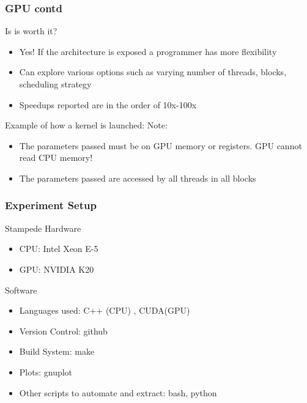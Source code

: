 \documentclass[mathserif]{beamer}
\begin{document}
\begin{frame}                                                                                                                                                                          
\frametitle{GPU contd}
Is is worth it?
\begin{itemize}
\item Yes! If the architecture is exposed a programmer has more flexibility 
\item Can explore various options such as varying number of threads, blocks, scheduling strategy 
\item Speedups reported are in the order of 10x-100x 
\end{itemize}
Example of how a kernel is launched:
Note: 
\begin{itemize}
\item The parameters passed must be on GPU memory or registers. GPU cannot read CPU memory!  
\item The parameters passed are accessed by all threads in all blocks
\end{itemize} 
\end{frame}             
 
\begin{frame}                                                                                                                                                                          
\frametitle{Experiment Setup}
\begin{block}{Stampede Hardware}
\begin{itemize}
\item CPU: Intel Xeon E-5 
\item GPU: NVIDIA K20 
\end{itemize}
\end{block}
\begin{block}{Software}
\begin{itemize}
\item Languages used: C++ (CPU) , CUDA(GPU) 
\item Version Control: github
\item Build System: make 
\item Plots: gnuplot  
\item Other scripts to automate and extract: bash, python  
\end{itemize}
\end{block}
\end{frame}              
\end{document}

